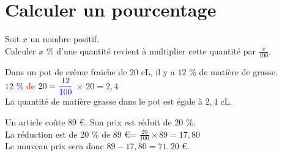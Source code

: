 \documentclass[12pt]{article}
\newif\iftrou\troufalse
\newlength{\trouwidth}
\newcommand{\trou}[1]{%
	\iftrou%
	\settowidth{\trouwidth}{#1}%
	\hbox to \trouwidth{\dotfill}%
	\else%
	#1%
	\fi}
\begin{document}

	
	
	
	\section{Calculer un pourcentage}
	
	\begin{prop}{}{}
		Soit $x$ un nombre positif.\\
		Calculer $x$ \% d'une quantité revient à multiplier cette quantité par $\displaystyle\frac{x}{100}$.
	\end{prop}
	
	\begin{ex}{}{}
		Dans un pot de crème fraiche de $20$ cL, il y a $12$ \% de matière de grasse.\\
		\textcolor{blue}{$12$ \%} \textcolor{red}{de} $20 = \textcolor{blue}{\displaystyle\frac{12}{100}}$ \textcolor{red}{$\times$} $20 =2,4$\\
		La quantité de matière grasse dans le pot est égale à $2,4$ cL.
	\end{ex}
	
	\begin{ex}{}{}
		Un article coûte $89$ \euro. Son prix est réduit de $20$ \%. \\
		La réduction est de 
		\trou{$20$ \% de $89$ \euro \hspace{0.1cm}= $\displaystyle\frac{20}{100} \times 89 = 17,80$}\\
		Le nouveau prix sera donc \trou{$89-17,80= 71,20$ \euro. }
	\end{ex}
	
\end{document}
